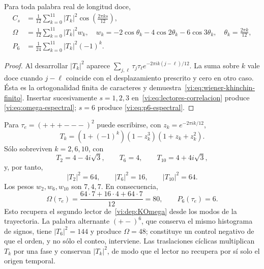 \begin{proposition}
Para toda palabra real de longitud doce,
\begin{align}
 C_s&=\frac1{12}\sum_{k=0}^{11}|T_k|^2
          \cos\!\left(\frac{2\pi ks}{12}\right),\label{vi:eq:wiener-khinchin-finito}\\
 \Omega&=\frac1{12}\sum_{k=0}^{11}|T_k|^2w_k,
 \quad
 w_k=-2\cos\theta_k-4\cos2\theta_k-6\cos3\theta_k,
 \quad\theta_k=\frac{2\pi k}{12},\label{vi:eq:omega-espectral}\\
 P_6&=\frac1{24}\sum_{k=0}^{11}|T_k|^2(-1)^k.
 \label{vi:eq:p6-espectral}
\end{align}
\end{proposition}
\begin{proof}
Al desarrollar $|T_k|^2$ aparece
$\sum_{j,\ell}\tau_j\tau_\ell e^{-2\pi ik(j-\ell)/12}$.
La suma sobre $k$ vale doce cuando $j-\ell$ coincide con el desplazamiento
prescrito y cero en otro caso. Ésta es la ortogonalidad finita de caracteres
y demuestra~\eqref{vi:eq:wiener-khinchin-finito}. Insertar sucesivamente
$s=1,2,3$ en~\eqref{vi:eq:lectores-correlacion} produce
\eqref{vi:eq:omega-espectral}; $s=6$ produce
\eqref{vi:eq:p6-espectral}.
\end{proof}

Para $\tau_e=(+++---)^2$ puede escribirse, con
$z_k=e^{-2\pi ik/12}$,
\begin{equation}
 T_k=(1+(-1)^k)(1-z_k^3)(1+z_k+z_k^2).
 \label{vi:eq:factorizacion-tk-electron}
\end{equation}
Sólo sobreviven $k=2,6,10$, con
\[
 T_2=4-4i\sqrt3,\qquad T_6=4,\qquad
 T_{10}=4+4i\sqrt3,
\]
y, por tanto,
\begin{equation}
 |T_2|^2=64,\qquad |T_6|^2=16,\qquad |T_{10}|^2=64.
 \label{vi:eq:potencias-espectrales-electron}
\end{equation}
Los pesos $w_2,w_6,w_{10}$ son $7,4,7$. En consecuencia,
\begin{equation}
 \Omega(\tau_e)=\frac{64\cdot7+16\cdot4+64\cdot7}{12}=80,
 \qquad P_6(\tau_e)=6.
 \label{vi:eq:omega-p6-electron}
\end{equation}
Esto recupera el segundo lector de~\eqref{vi:dep:KOmega} desde los modos
de la trayectoria. La palabra alternante $(+-)^6$, que conserva el mismo
histograma de signos, tiene $|T_6|^2=144$ y produce $\Omega=48$; constituye
un control negativo de que el orden, y no sólo el conteo, interviene.
Las traslaciones cíclicas multiplican $T_k$ por una fase y conservan
$|T_k|^2$, de modo que el lector no recupera por sí solo el origen temporal.

